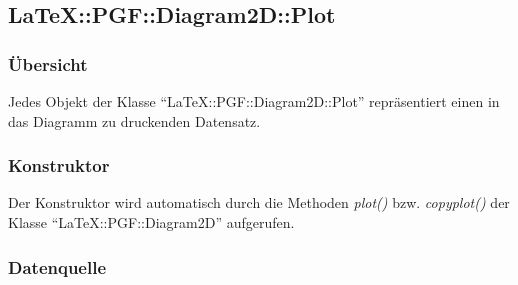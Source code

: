 \documentclass[ngerman,origlongtable]{scrartcl}
\begin{document}
\subsection[Plot]{LaTeX::PGF::Diagram2D::Plot}
\subsubsection{Übersicht}
Jedes Objekt der Klasse "`LaTeX::PGF::Diagram2D::Plot"' repräsentiert einen
in das Diagramm zu druckenden Datensatz.
\subsubsection{Konstruktor}
Der Konstruktor wird automatisch durch die Methoden
\textit{plot()\/} bzw.
\textit{copy\textunderscore{}plot()\/} der Klasse
"`LaTeX::PGF::Diagram2D"' aufgerufen.
\subsubsection{Datenquelle}
\end{document}

